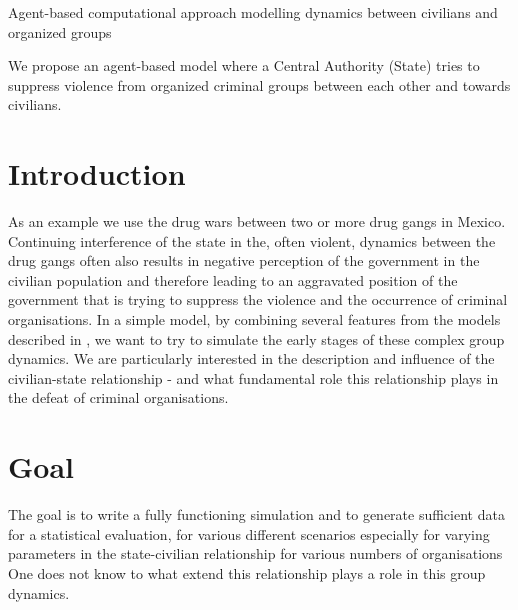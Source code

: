 \documentclass[8 pt]{scrartcl}
\begin{document}
\setlength{\parindent}{0mm}
\vspace*{0.5cm}
\begin{center}
\huge
Agent-based computational approach modelling dynamics between civilians and organized groups
\end{center}
\vspace{0.5cm}
We propose an agent-based model where a Central Authority (State) tries to suppress violence from organized criminal groups between each other and towards civilians.

\section{Introduction}
As an example we use the drug wars between two or more drug gangs in Mexico. Continuing interference of the state in the, often violent, dynamics between the drug gangs often also results in negative perception of the government in the civilian population and therefore leading to an aggravated position of the government that is trying to suppress the violence and the occurrence of criminal organisations. In a simple model, by combining several features from the models described in \cite{epstein, bennet}, we want to try to simulate the early stages of these complex group dynamics. We are particularly interested in the description and influence of the civilian-state relationship - and what fundamental role this relationship plays in the defeat of criminal organisations.

\section{Goal}
The goal is to write a fully functioning simulation and to generate sufficient data for a statistical evaluation, for various different scenarios especially for varying parameters in the state-civilian relationship for various numbers of organisations One does not know to what extend this relationship plays a role in this group dynamics.
\end{document}
